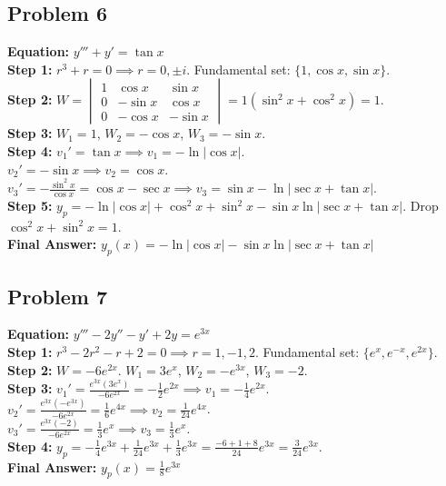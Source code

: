 \documentclass[11pt]{article}
\begin{document}
\subsection*{Problem 6}
\textbf{Equation:} $y''' + y' = \tan x$ \\
\textbf{Step 1:} $r^3 + r = 0 \implies r = 0, \pm i$. Fundamental set: $\{1, \cos x, \sin x\}$. \\
\textbf{Step 2:} $W = \begin{vmatrix} 1 & \cos x & \sin x \\ 0 & -\sin x & \cos x \\ 0 & -\cos x & -\sin x \end{vmatrix} = 1(\sin^2 x + \cos^2 x) = 1$. \\
\textbf{Step 3:} $W_1 = 1$, $W_2 = -\cos x$, $W_3 = -\sin x$. \\
\textbf{Step 4:} $v_1' = \tan x \implies v_1 = -\ln|\cos x|$. \\
$v_2' = -\sin x \implies v_2 = \cos x$. \\
$v_3' = -\frac{\sin^2 x}{\cos x} = \cos x - \sec x \implies v_3 = \sin x - \ln|\sec x + \tan x|$. \\
\textbf{Step 5:} $y_p = -\ln|\cos x| + \cos^2 x + \sin^2 x - \sin x\ln|\sec x + \tan x|$. Drop $\cos^2 x + \sin^2 x = 1$. \\
\textbf{Final Answer:} $y_p(x) = -\ln|\cos x| - \sin x\ln|\sec x + \tan x|$

\subsection*{Problem 7}
\textbf{Equation:} $y''' - 2y'' - y' + 2y = e^{3x}$ \\
\textbf{Step 1:} $r^3 - 2r^2 - r + 2 = 0 \implies r = 1, -1, 2$. Fundamental set: $\{e^x, e^{-x}, e^{2x}\}$. \\
\textbf{Step 2:} $W = -6e^{2x}$. $W_1 = 3e^x$, $W_2 = -e^{3x}$, $W_3 = -2$. \\
\textbf{Step 3:} $v_1' = \frac{e^{3x}(3e^x)}{-6e^{2x}} = -\frac{1}{2}e^{2x} \implies v_1 = -\frac{1}{4}e^{2x}$. \\
$v_2' = \frac{e^{3x}(-e^{3x})}{-6e^{2x}} = \frac{1}{6}e^{4x} \implies v_2 = \frac{1}{24}e^{4x}$. \\
$v_3' = \frac{e^{3x}(-2)}{-6e^{2x}} = \frac{1}{3}e^x \implies v_3 = \frac{1}{3}e^x$. \\
\textbf{Step 4:} $y_p = -\frac{1}{4}e^{3x} + \frac{1}{24}e^{3x} + \frac{1}{3}e^{3x} = \frac{-6+1+8}{24}e^{3x} = \frac{3}{24}e^{3x}$. \\
\textbf{Final Answer:} $y_p(x) = \frac{1}{8}e^{3x}$
\end{document}
